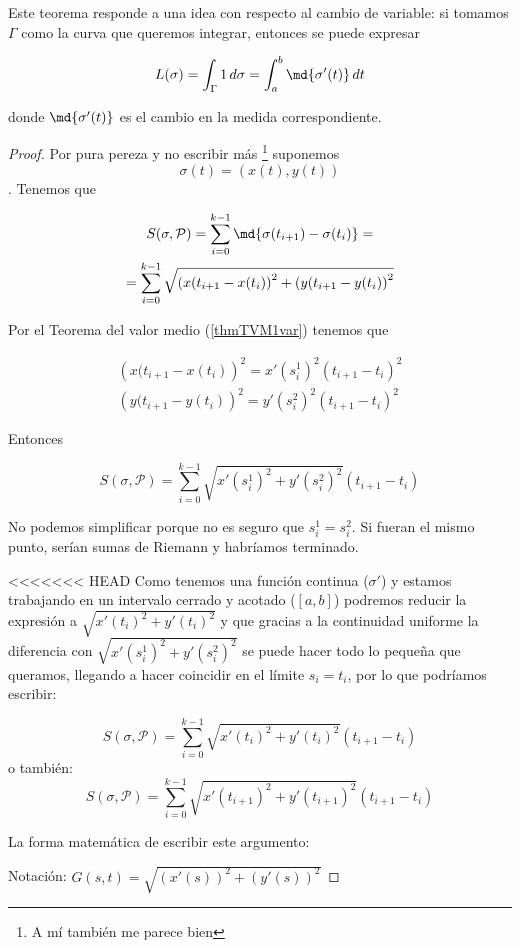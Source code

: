 Este teorema responde a una idea con respecto al cambio de variable: si tomamos $\Gamma$ como la curva que queremos integrar, entonces se puede expresar

\[ L(\sigma) = \int_\Gamma 1\,d\sigma = \int_a^b \md{\sigma'(t)}\,dt  \]

donde $\md{\sigma'(t)}$ es el cambio en la medida correspondiente.

\begin{proof} Por pura pereza y no escribir más \footnote{A mí también me parece bien} suponemos \[ \sigma(t) = (x(t),y(t)) \]. Tenemos que

\begin{gather*}
 S(\sigma,\mathcal{P}) = \sum_{i=0}^{k-1} \md{\sigma(t_{i+1}) - \sigma(t_i)} = \\
 = \sum_{i=0}^{k-1}\sqrt{\left(x(t_{i+1}-x(t_i)\right)^2 + \left(y(t_{i+1}-y(t_i)\right)^2}
 \end{gather*}
 
 Por el Teorema del valor medio (\ref{thmTVM1var}) tenemos que
 
 \begin{gather*}
 \left(x(t_{i+1}-x(t_i)\right)^2  = x'(s_i^1)^2(t_{i+1}-t_i)^2 \\
 \left(y(t_{i+1}-y(t_i)\right)^2  = y'(s_i^2)^2(t_{i+1}-t_i)^2
 \end{gather*}
 
 Entonces
 
 \[  S(\sigma,\mathcal{P})  = \sum_{i=0}^{k-1} \sqrt{x'(s_i^1)^2 + y'(s_i^2)^2} (t_{i+1}-t_i) \]
 
 No podemos simplificar porque no es seguro que $s_i^1 = s_i^2$. Si fueran el mismo punto, serían sumas de Riemann y habríamos terminado.
 
<<<<<<< HEAD
 Como tenemos una función continua ($\sigma'$) y estamos trabajando en un intervalo cerrado y acotado ($[a,b]$) podremos reducir la expresión a $\sqrt{x'(t_i)^2 + y'(t_i)^2}$ y que gracias a la continuidad uniforme la diferencia con $\sqrt{x'(s_i^1)^2 + y'(s_i^2)^2}$ se puede hacer todo lo pequeña que queramos, llegando a hacer coincidir en el límite $s_i = t_i$, por lo que podríamos escribir:
 
\[  S(\sigma,\mathcal{P})  = \sum_{i=0}^{k-1} \sqrt{x'(t_i)^2 + y'(t_i)^2} (t_{i+1}-t_i) \]
  o también:
\[  S(\sigma,\mathcal{P})  = \sum_{i=0}^{k-1} \sqrt{x'(t_{i+1})^2 + y'(t_{i+1})^2} (t_{i+1}-t_i) \]


La forma matemática de escribir este argumento:

Notación: $G(s,t) = \sqrt{(x'(s))^2 + (y'(s))^2}$


\end{proof}
